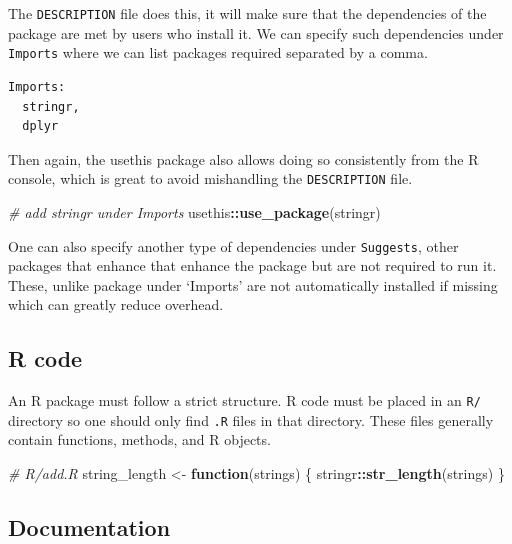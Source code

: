 \documentclass[
]{krantz}
\makeatletter
\newenvironment{Shaded}{\begin{snugshade}}{\end{snugshade}}
\newcommand{\CommentTok}[1]{\textcolor[rgb]{0.37,0.37,0.37}{\textit{#1}}}
\newcommand{\ControlFlowTok}[1]{\textcolor[rgb]{0.27,0.27,0.27}{\textbf{#1}}}
\newcommand{\KeywordTok}[1]{\textcolor[rgb]{0.27,0.27,0.27}{\textbf{#1}}}
\newcommand{\NormalTok}[1]{#1}
\newcommand{\OperatorTok}[1]{\textcolor[rgb]{0.43,0.43,0.43}{\textbf{#1}}}
\newcommand{\StringTok}[1]{\textcolor[rgb]{0.5,0.5,0.5}{#1}}
\newenvironment{kframe}{%
\medskip{}
\setlength{\fboxsep}{.8em}
 \def\at@end@of@kframe{}%
 \ifinner\ifhmode%
  \def\at@end@of@kframe{\end{minipage}}%
  \begin{minipage}{\columnwidth}%
 \fi\fi%
 \def\FrameCommand##1{\hskip\@totalleftmargin \hskip-\fboxsep
 \colorbox{shadecolor}{##1}\hskip-\fboxsep
     \hskip-\linewidth \hskip-\@totalleftmargin \hskip\columnwidth}%
 \MakeFramed {\advance\hsize-\width
   \@totalleftmargin\z@ \linewidth\hsize
   \@setminipage}}%
 {\par\unskip\endMakeFramed%
 \at@end@of@kframe}
\renewenvironment{Shaded}{\begin{kframe}}{\end{kframe}}
\makeatother
\begin{document}
The \texttt{DESCRIPTION} file does this, it will make sure that the dependencies of the package are met by users who install it. We can specify such dependencies under \texttt{Imports} where we can list packages required separated by a comma.

\begin{verbatim}
Imports:
  stringr,
  dplyr
\end{verbatim}

Then again, the usethis package also allows doing so consistently from the R console, which is great to avoid mishandling the \texttt{DESCRIPTION} file.

\begin{Shaded}
\begin{Highlighting}[]
\CommentTok{\# add stringr under Imports}
\NormalTok{usethis}\OperatorTok{::}\KeywordTok{use\_package}\NormalTok{(}\StringTok{\textquotesingle{}stringr\textquotesingle{}}\NormalTok{)}
\end{Highlighting}
\end{Shaded}

One can also specify another type of dependencies under \texttt{Suggests}, other packages that enhance that enhance the package but are not required to run it. These, unlike package under `Imports' are not automatically installed if missing which can greatly reduce overhead.

\hypertarget{basics-r-code}{%
\subsection{R code}\label{basics-r-code}}

An R package must follow a strict structure. R code must be placed in an \texttt{R/} directory so one should only find \texttt{.R} files in that directory. These files generally contain functions, methods, and R objects.

\begin{Shaded}
\begin{Highlighting}[]
\CommentTok{\# R/add.R}
\NormalTok{string\_length \textless{}{-}}\StringTok{ }\ControlFlowTok{function}\NormalTok{(strings) \{}
\NormalTok{  stringr}\OperatorTok{::}\KeywordTok{str\_length}\NormalTok{(strings)}
\NormalTok{\}}
\end{Highlighting}
\end{Shaded}

\hypertarget{basics-documentation}{%
\subsection{Documentation}\label{basics-documentation}}
\end{document}
